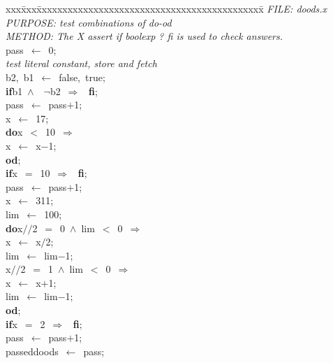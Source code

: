 \documentclass{report}
\begin{document}
\pagestyle{empty}
\begin{tabbing}
xxx\=xxx\=xxxxxxxxxxxxxxxxxxxxxxxxxxxxxxxxxxxxxxxxxxxx\=\kill
{\tt{}}{\em{} FILE:    doods.x
}\\
{\tt{}}{\em{} PURPOSE: test combinations of do-od
}\\
{\tt{}}{\em{} METHOD:  The X assert  if boolexp ? fi is used to check answers.
}\\
pass\ $\leftarrow$\ 0;\\
{\tt{}}{\em{} test literal constant, store and fetch
}\\
b2,\ b1\ $\leftarrow$\ false,\ true;\\
{\bf if}\>b1\ $\wedge$\ \ $\neg$b2\ $\Rightarrow$
\ {\bf {f}{i}};
\\
pass\ $\leftarrow$\ pass$+$1;\\
x\ $\leftarrow$\ 17;\\
{\bf do}\>x\ $<$\ 10\ $\Rightarrow$
\\
\>x\ $\leftarrow$\ x$-$1;\\
{\bf od};
\\
{\bf if}\>x\ $=$\ 10\ $\Rightarrow$
\ {\bf {f}{i}};
\\
pass\ $\leftarrow$\ pass$+$1;\\
x\ $\leftarrow$\ 311;\\
lim\ $\leftarrow$\ 100;\\
{\bf do}\>x$/\!\!/$2\ $=$\ 0\ $\wedge$\ lim\ $<$\ 0\ $\Rightarrow$
\\
\>x\ $\leftarrow$\ x$/$2;\\
\>lim\ $\leftarrow$\ lim$-$1;\\
\raisebox{2pt}{\ \ \framebox[2pt]{\rule{0pt}{1pt}}}
\>x$/\!\!/$2\ $=$\ 1\ $\wedge$\ lim\ $<$\ 0\ $\Rightarrow$
\\
\>x\ $\leftarrow$\ x$+$1;\\
\>lim\ $\leftarrow$\ lim$-$1;\\
{\bf od};
\\
{\bf if}\>x\ $=$\ 2\ $\Rightarrow$
\ {\bf {f}{i}};
\\
pass\ $\leftarrow$\ pass$+$1;\\
passeddoods\ $\leftarrow$\ pass;\\
\end{tabbing}
\end{document}
